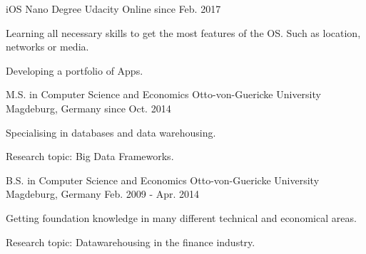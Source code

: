 

\begin{cventries}

     
   \cventry
    {iOS Nano Degree} %
    {Udacity} %
    {Online} %
    {since Feb. 2017} %
    {
      \begin{cvitems} %
          \item{Learning all necessary skills to get the most features of the OS. Such as location, networks or media.}
          \item{Developing a portfolio of Apps.}
      \end{cvitems}
    }
    
   \cventry
    {M.S. in Computer Science and Economics} %
    {Otto-von-Guericke University} %
    {Magdeburg, Germany} %
    {since Oct. 2014} %
    {
      \begin{cvitems} %
          \item{Specialising in databases and data warehousing.}
          \item{Research topic: Big Data Frameworks.}
      \end{cvitems}
    }
    
   \cventry
    {B.S. in Computer Science and Economics} %
    {Otto-von-Guericke University} %
    {Magdeburg, Germany} %
    {Feb. 2009 - Apr. 2014} %
    {
      \begin{cvitems} %
          \item{Getting foundation knowledge in many different technical and economical areas.}
          \item{Research topic: Datawarehousing in the finance industry.}
      \end{cvitems}
    }
\end{cventries}
